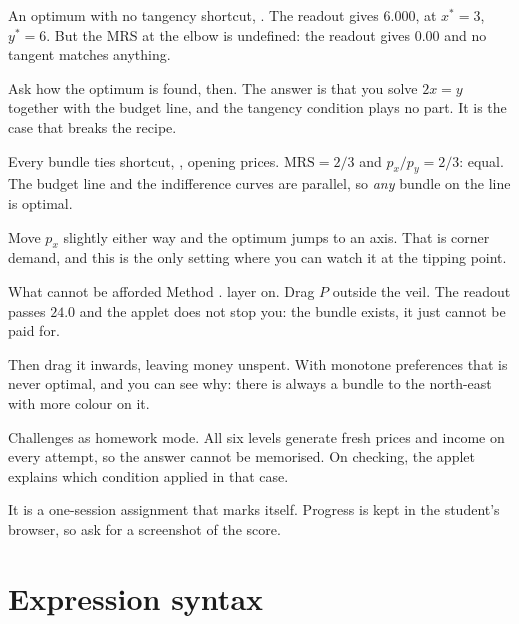 \documentclass[11pt,a4paper]{appletmanual}
\begin{document}
\begin{activity}{An optimum with no tangency}
\amset {} shortcut, .
\amexp The  readout gives $6.000$, at $x^\ast = 3$, $y^\ast = 6$. But
the MRS at the elbow is undefined: the readout gives $0.00$ and no tangent
matches anything.
\par\smallskip
Ask how the optimum is found, then. The answer is that you solve $2x = y$
together with the budget line, and the tangency condition plays no part. It is
the case that breaks the recipe.
\end{activity}

\begin{activity}{Every bundle ties}
\amset {} shortcut, , opening prices.
\amexp $\text{MRS} = 2/3$ and $p_x/p_y = 2/3$: equal. The budget line and the
indifference curves are parallel, so \emph{any} bundle on the line is optimal.
\par\smallskip
Move $p_x$ slightly either way and the optimum jumps to an axis. That is corner
demand, and this is the only setting where you can watch it at the tipping
point.
\end{activity}

\begin{activity}{What cannot be afforded}
\amset Method .  layer on.
\amexp Drag $P$ outside the veil. The  readout passes $24.0$ and the
applet does not stop you: the bundle exists, it just cannot be paid for.
\par\smallskip
Then drag it inwards, leaving money unspent. With monotone preferences that is
never optimal, and you can see why: there is always a bundle to the north-east
with more colour on it.
\end{activity}

\begin{activity}{Challenges as homework}
\amset {} mode.
\amexp All six levels generate fresh prices and income on every attempt, so the
answer cannot be memorised. On checking, the applet explains which condition
applied in that case.
\par\smallskip
It is a one-session assignment that marks itself. Progress is kept in the
student's browser, so ask for a screenshot of the score.
\end{activity}

\section{Expression syntax}
\end{document}

